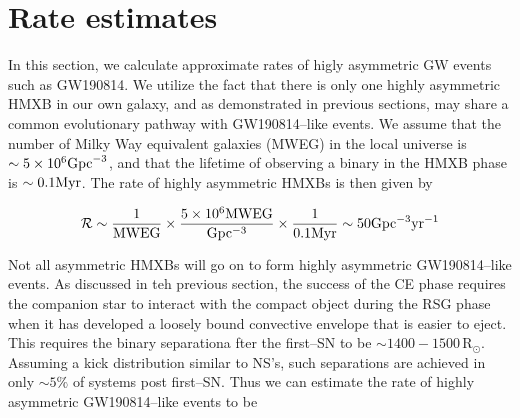 \documentclass[linenumbers,trackchanges,twocolumn]{aastex701}
\newcommand{\Rdot}{\mathrm{R}_{\odot}}
\begin{document}

 \section{Rate estimates}

 In this section, we calculate approximate rates of higly asymmetric GW events such as GW190814. We utilize the fact that there is only one highly asymmetric HMXB in our own galaxy, and as demonstrated in previous sections, may share a common evolutionary pathway with GW190814--like events. We assume that the number of Milky Way equivalent galaxies (MWEG) in the local universe is $\sim 5 \times 10^6 \rm{Gpc}^{-3}$, and that the lifetime of observing a binary in the HMXB phase is $\sim 0.1 \rm Myr$. The rate of highly asymmetric HMXBs is then given by 

 \begin{equation}
    \rm \mathcal{R} \sim \frac{1}{MWEG} \times \frac{5\times 10^6 MWEG}{Gpc^{-3}} \times \frac{1}{0.1 Myr} \sim 50 Gpc^{-3} yr^{-1} 
 \end{equation}

 Not all asymmetric HMXBs will go on to form highly asymmetric GW190814--like events. As discussed in teh previous section, the success of the CE phase requires the companion star to interact with the compact object during the RSG phase when it has developed a loosely bound convective envelope that is easier to eject. This requires the binary separationa fter the first--SN to be $\sim 1400-1500\, \Rdot$. Assuming a kick distribution similar to NS's, such separations are achieved in only $\sim 5\%$ of systems post first--SN. Thus we can estimate the rate of highly asymmetric GW190814--like events to be 
\end{document}
